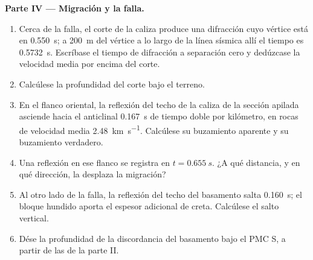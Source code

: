 \begin{problem}
\noindent\textbf{Parte IV --- Migración y la falla.}
\begin{enumerate}[resume]
  \item Cerca de la falla, el corte de la caliza produce una difracción
        cuyo vértice está en \qty{0.550}{s}; a \qty{200}{m} del vértice a lo largo de la línea
        sísmica allí el tiempo es \qty{0.5732}{s}. Escríbase el tiempo de difracción a separación cero y
        dedúzcase la velocidad media por encima del corte.
  \item Calcúlese la profundidad del corte bajo el terreno.
  \item En el flanco oriental, la reflexión del techo de la caliza de la sección apilada
        asciende hacia el anticlinal \qty{0.167}{s} de tiempo doble por
        kilómetro, en rocas de velocidad media \qty{2.48}{km.s^{-1}}. Calcúlese su
        buzamiento aparente y su buzamiento verdadero.
  \item Una reflexión en ese flanco se registra en $t = \qty{0.655}{s}$. ¿A qué distancia,
        y en qué dirección, la desplaza la migración?
  \item Al otro lado de la falla, la reflexión del techo del basamento salta \qty{0.160}{s};
        el bloque hundido aporta el espesor adicional de creta. Calcúlese el
        salto vertical.
  \item Dése la profundidad de la discordancia del basamento bajo el PMC S, a partir de las
         de la parte II.
\end{enumerate}
\end{problem}
